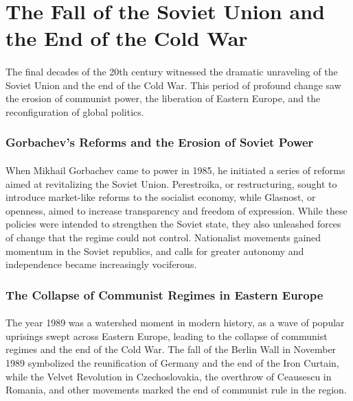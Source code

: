 \documentclass[a4paper,12pt]{book}
\begin{document}
\section*{The Fall of the Soviet Union and the End of the Cold War}
\paragraph{}
The final decades of the 20th century witnessed the dramatic unraveling of the Soviet Union and the end of the Cold War. This period of profound change saw the erosion of communist power, the liberation of Eastern Europe, and the reconfiguration of global politics. 

\subsubsection*{Gorbachev’s Reforms and the Erosion of Soviet Power}
\paragraph{}
When Mikhail Gorbachev came to power in 1985, he initiated a series of reforms aimed at revitalizing the Soviet Union. Perestroika, or restructuring, sought to introduce market-like reforms to the socialist economy, while Glasnost, or openness, aimed to increase transparency and freedom of expression. While these policies were intended to strengthen the Soviet state, they also unleashed forces of change that the regime could not control. Nationalist movements gained momentum in the Soviet republics, and calls for greater autonomy and independence became increasingly vociferous. 

\subsubsection*{The Collapse of Communist Regimes in Eastern Europe}
\paragraph{}
The year 1989 was a watershed moment in modern history, as a wave of popular uprisings swept across Eastern Europe, leading to the collapse of communist regimes and the end of the Cold War. The fall of the Berlin Wall in November 1989 symbolized the reunification of Germany and the end of the Iron Curtain, while the Velvet Revolution in Czechoslovakia, the overthrow of Ceausescu in Romania, and other movements marked the end of communist rule in the region. 
\end{document}
